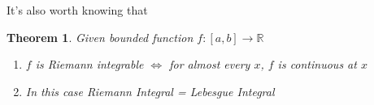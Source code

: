 \documentclass[11pt]{article}
\newcommand{\R}{\mathbb{R}}
\newtheorem{theorem}{Theorem}[section]
\begin{document}
It's also worth knowing that
\begin{theorem}
Given bounded function $f:[a, b]\to\R$
\begin{enumerate}[label=(\alph*)]
	\item $f$ is Riemann integrable $\iff$ for almost every $x$, $f$ is continuous at $x$
	\item In this case Riemann Integral = Lebesgue Integral
\end{enumerate}
\end{theorem}
\end{document}
